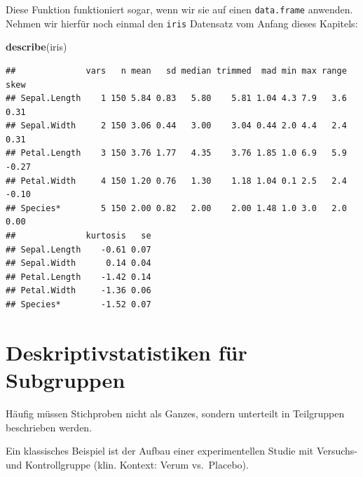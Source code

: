 \documentclass[
]{book}
\newenvironment{Shaded}{\begin{snugshade}}{\end{snugshade}}
\newcommand{\FunctionTok}[1]{\textcolor[rgb]{0.13,0.29,0.53}{\textbf{#1}}}
\newcommand{\NormalTok}[1]{#1}
\begin{document}
Diese Funktion funktioniert sogar, wenn wir sie auf einen \texttt{data.frame} anwenden. Nehmen wir hierfür noch einmal den \texttt{iris} Datensatz vom Anfang dieses Kapitels:

\begin{Shaded}
\begin{Highlighting}[]
\FunctionTok{describe}\NormalTok{(iris)}
\end{Highlighting}
\end{Shaded}

\begin{verbatim}
##              vars   n mean   sd median trimmed  mad min max range  skew
## Sepal.Length    1 150 5.84 0.83   5.80    5.81 1.04 4.3 7.9   3.6  0.31
## Sepal.Width     2 150 3.06 0.44   3.00    3.04 0.44 2.0 4.4   2.4  0.31
## Petal.Length    3 150 3.76 1.77   4.35    3.76 1.85 1.0 6.9   5.9 -0.27
## Petal.Width     4 150 1.20 0.76   1.30    1.18 1.04 0.1 2.5   2.4 -0.10
## Species*        5 150 2.00 0.82   2.00    2.00 1.48 1.0 3.0   2.0  0.00
##              kurtosis   se
## Sepal.Length    -0.61 0.07
## Sepal.Width      0.14 0.04
## Petal.Length    -1.42 0.14
## Petal.Width     -1.36 0.06
## Species*        -1.52 0.07
\end{verbatim}

\section{Deskriptivstatistiken für Subgruppen}\label{deskriptivstatistiken-fuxfcr-subgruppen}

Häufig müssen Stichproben nicht als Ganzes, sondern unterteilt in Teilgruppen beschrieben werden.

Ein klassisches Beispiel ist der Aufbau einer experimentellen Studie mit Versuchs- und Kontrollgruppe (klin. Kontext: Verum vs.~Placebo).
\end{document}
